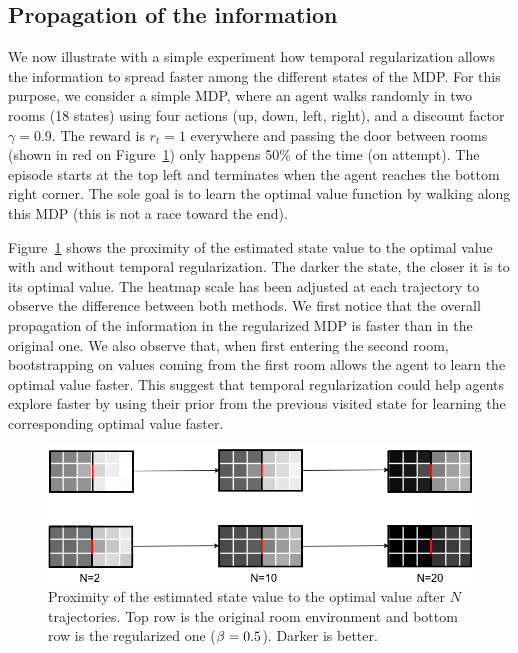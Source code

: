 \subsection{Propagation of the information}
We now illustrate with a simple experiment how temporal regularization allows the information to spread faster among the different states of the MDP. For this purpose, we consider a simple MDP, where an agent walks randomly in two rooms (18 states) using four actions (up, down, left, right), and a discount factor $\gamma=0.9$. The reward is $r_t=1$ everywhere and passing the door between rooms (shown in red on Figure~\ref{fig:room}) only happens 50\% of the time (on attempt). The episode starts at the top left and terminates when the agent reaches the bottom right corner. The sole goal is to learn the optimal value function by walking along this MDP (this is not a race toward the end).

Figure~\ref{fig:room} shows the proximity of the estimated state value to the optimal value with and without temporal regularization. The darker the state, the closer it is to its optimal value. The heatmap scale has been adjusted at each trajectory to observe the difference between both methods.
We first notice that the overall propagation of the information in the regularized MDP is faster than in the original one. We also observe that, when first entering the second room, bootstrapping on values coming from the first room allows the agent to learn the optimal value faster. This suggest that temporal regularization could help agents explore faster by using their prior from the previous visited state for learning the corresponding optimal value faster.

\begin{figure}
    \centering
    \includegraphics[scale=0.44]{fig/room.png}
    \caption{Proximity of the estimated state value to the optimal value after $N$ trajectories. Top row is the original room environment and bottom row is the regularized one ($\beta = 0.5$). Darker is better.}
    \label{fig:room}
\end{figure}


